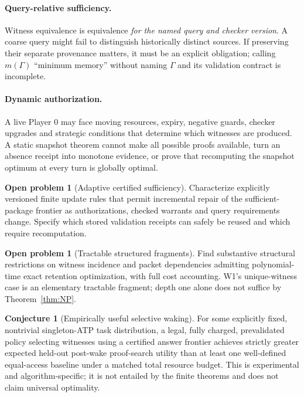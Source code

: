 \documentclass[10pt,letterpaper]{article}
\theoremstyle{definition}
\newtheorem{problem}[theorem]{Open problem}
\newtheorem{conjecture}[theorem]{Conjecture}
\theoremstyle{remark}
\begin{document}
\paragraph{Query-relative sufficiency.} Witness equivalence is equivalence \emph{for the named query and checker version}. A coarse query might fail to distinguish historically distinct sources. If preserving their separate provenance matters, it must be an explicit obligation; calling $m(\Gamma)$ ``minimum memory'' without naming $\Gamma$ and its validation contract is incomplete.

\paragraph{Dynamic authorization.} A live Player 0 may face moving resources, expiry, negative guards, checker upgrades and strategic conditions that determine which witnesses are produced. A static snapshot theorem cannot make all possible proofs available, turn an absence receipt into monotone evidence, or prove that recomputing the snapshot optimum at every turn is globally optimal.

\begin{problem}[Adaptive certified sufficiency]
Characterize explicitly versioned finite update rules that permit incremental repair of the sufficient-package frontier as authorizations, checked warrants and query requirements change. Specify which stored validation receipts can safely be reused and which require recomputation.
\end{problem}

\begin{problem}[Tractable structured fragments]
Find substantive structural restrictions on witness incidence and packet dependencies admitting polynomial-time exact retention optimization, with full cost accounting. W1's unique-witness case is an elementary tractable fragment; depth one alone does not suffice by Theorem~\ref{thm:NP}.
\end{problem}

\begin{conjecture}[Empirically useful selective waking]
For some explicitly fixed, nontrivial singleton-ATP task distribution, a legal, fully charged, prevalidated policy selecting witnesses using a certified answer frontier achieves strictly greater expected held-out post-wake proof-search utility than at least one well-defined equal-access baseline under a matched total resource budget. This is experimental and algorithm-specific; it is not entailed by the finite theorems and does not claim universal optimality.
\end{conjecture}
\end{document}
